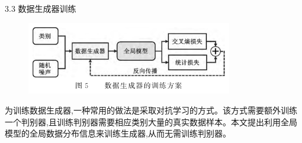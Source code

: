 \documentclass{sintefbeamer}
\theoremstyle{definition}
\begin{document}
\begin{frame}{3.3 数据生成器训练}
\begin{figure}[ht]
\centering
\includegraphics[width=0.8\textwidth]{images/img_gan_train}
\end{figure}
为训练数据生成器,一种常用的做法是采取对抗学习的方式。该方式需要额外训练一个判别器,且训练判别器需要相应类别大量的真实数据样本。本文提出利用全局模型的全局数据分布信息来训练生成器,从而无需训练判别器。
\end{frame}
\end{document}
